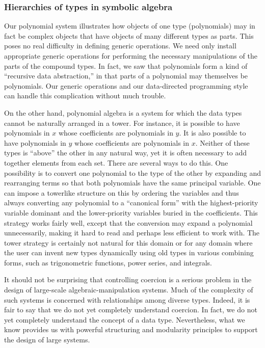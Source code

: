 \subsubsection*{Hierarchies of types in symbolic algebra}

Our polynomial system illustrates how objects of one type (polynomials) may in fact be complex objects that have objects of many different types as parts.
This poses no real difficulty in defining generic operations.
We need only install appropriate generic operations for performing the necessary manipulations of the parts of the compound types.
In fact, we saw that polynomials form a kind of “recursive data abstraction,” in that parts of a polynomial may themselves be polynomials.
Our generic operations and our data-directed programming style can handle this complication without much trouble.

On the other hand, polynomial algebra is a system for which the data types cannot be naturally arranged in a tower.
For instance, it is possible to have polynomials in \( x \) whose coefficients are polynomials in \( y \).
It is also possible to have polynomials in \( y \) whose coefficients are polynomials in \( x \).
Neither of these types is “above” the other in any natural way, yet it is often necessary to add together elements from each set.
There are several ways to do this.
One possibility is to convert one polynomial to the type of the other by expanding and rearranging terms so that both polynomials have the same principal variable.
One can impose a towerlike structure on this by ordering the variables and thus always converting any polynomial to a “canonical form” with the highest-priority variable dominant and the lower-priority variables buried in the coefficients.
This strategy works fairly well, except that the conversion may expand a polynomial unnecessarily, making it hard to read and perhaps less efficient to work with.
The tower strategy is certainly not natural for this domain or for any domain where the user can invent new types dynamically using old types in various combining forms, such as trigonometric functions, power series, and integrals.

It should not be surprising that controlling coercion is a serious problem in the design of large-scale algebraic-manipulation systems.
Much of the complexity of such systems is concerned with relationships among diverse types.
Indeed, it is fair to say that we do not yet completely understand coercion.
In fact, we do not yet completely understand the concept of a data type.
Nevertheless, what we know provides us with powerful structuring and modularity principles to support the design of large systems.



